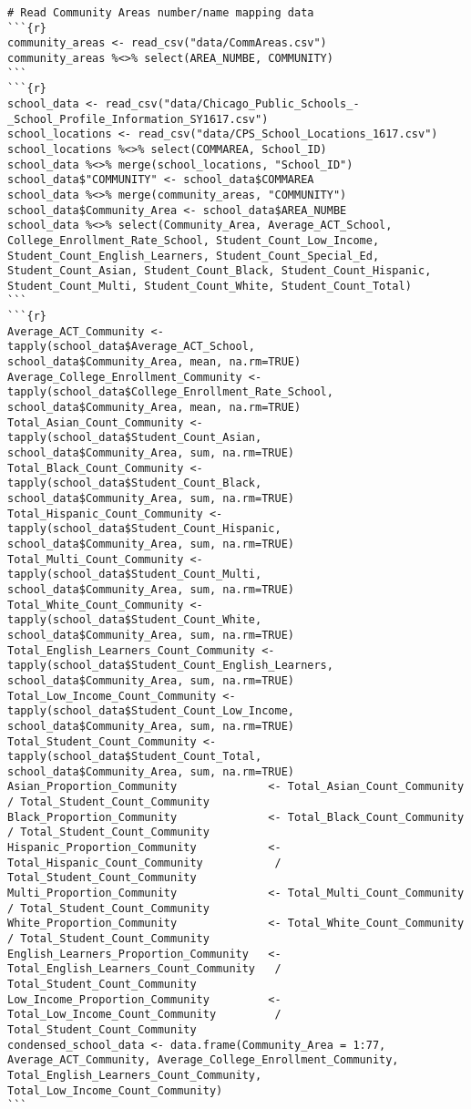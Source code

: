 \documentclass{article}
\begin{document}
\begin{verbatim}
# Read Community Areas number/name mapping data
```{r}
community_areas <- read_csv("data/CommAreas.csv")
community_areas %<>% select(AREA_NUMBE, COMMUNITY)
```
```{r}
school_data <- read_csv("data/Chicago_Public_Schools_-_School_Profile_Information_SY1617.csv")
school_locations <- read_csv("data/CPS_School_Locations_1617.csv")
school_locations %<>% select(COMMAREA, School_ID)
school_data %<>% merge(school_locations, "School_ID")
school_data$"COMMUNITY" <- school_data$COMMAREA
school_data %<>% merge(community_areas, "COMMUNITY")
school_data$Community_Area <- school_data$AREA_NUMBE
school_data %<>% select(Community_Area, Average_ACT_School, College_Enrollment_Rate_School, Student_Count_Low_Income, Student_Count_English_Learners, Student_Count_Special_Ed, Student_Count_Asian, Student_Count_Black, Student_Count_Hispanic, Student_Count_Multi, Student_Count_White, Student_Count_Total)
```
```{r}
Average_ACT_Community <-                    tapply(school_data$Average_ACT_School,              school_data$Community_Area, mean, na.rm=TRUE)
Average_College_Enrollment_Community <-     tapply(school_data$College_Enrollment_Rate_School,  school_data$Community_Area, mean, na.rm=TRUE)
Total_Asian_Count_Community <-              tapply(school_data$Student_Count_Asian,             school_data$Community_Area, sum, na.rm=TRUE)
Total_Black_Count_Community <-              tapply(school_data$Student_Count_Black,             school_data$Community_Area, sum, na.rm=TRUE)
Total_Hispanic_Count_Community <-           tapply(school_data$Student_Count_Hispanic,          school_data$Community_Area, sum, na.rm=TRUE)
Total_Multi_Count_Community <-              tapply(school_data$Student_Count_Multi,             school_data$Community_Area, sum, na.rm=TRUE)
Total_White_Count_Community <-              tapply(school_data$Student_Count_White,             school_data$Community_Area, sum, na.rm=TRUE)
Total_English_Learners_Count_Community <-   tapply(school_data$Student_Count_English_Learners,  school_data$Community_Area, sum, na.rm=TRUE)
Total_Low_Income_Count_Community <-         tapply(school_data$Student_Count_Low_Income,        school_data$Community_Area, sum, na.rm=TRUE)
Total_Student_Count_Community <-            tapply(school_data$Student_Count_Total,             school_data$Community_Area, sum, na.rm=TRUE)
Asian_Proportion_Community              <- Total_Asian_Count_Community              / Total_Student_Count_Community
Black_Proportion_Community              <- Total_Black_Count_Community              / Total_Student_Count_Community
Hispanic_Proportion_Community           <- Total_Hispanic_Count_Community           / Total_Student_Count_Community
Multi_Proportion_Community              <- Total_Multi_Count_Community              / Total_Student_Count_Community
White_Proportion_Community              <- Total_White_Count_Community              / Total_Student_Count_Community
English_Learners_Proportion_Community   <- Total_English_Learners_Count_Community   / Total_Student_Count_Community
Low_Income_Proportion_Community         <- Total_Low_Income_Count_Community         / Total_Student_Count_Community
condensed_school_data <- data.frame(Community_Area = 1:77, Average_ACT_Community, Average_College_Enrollment_Community, Total_English_Learners_Count_Community, Total_Low_Income_Count_Community)
```


\end{verbatim}
\end{document}
